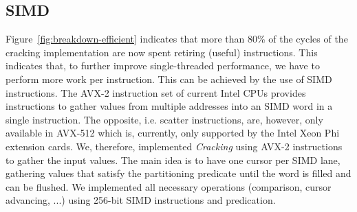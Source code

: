 \subsection*{SIMD}
\label{subsec:single-threaded-simd}
Figure~\ref{fig:breakdown-efficient} indicates that more than 80\% of
the cycles of the cracking implementation are now spent retiring
(useful) instructions. This indicates that, to further improve
single-threaded performance, we have to perform more work per
instruction. This can be achieved by the use of SIMD instructions. The
AVX-2 instruction set of current Intel CPUs provides instructions to
gather values from multiple addresses into an SIMD word in a single
instruction. The opposite, i.e. scatter instructions, are, however,
only available in AVX-512 which is, currently, only supported by the
Intel Xeon Phi extension cards. We, therefore, implemented
\emph{Cracking} using AVX-2 instructions to gather the input
values. The main idea is to have one cursor per SIMD lane, gathering
values that satisfy the partitioning predicate until the word is
filled and can be flushed. We implemented all necessary operations
(comparison, cursor advancing, ...)  using 256-bit SIMD instructions
and predication.

